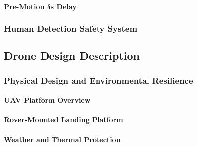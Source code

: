 \paragraph{Pre-Motion 5s Delay}
\label{par:pre_motion_5s_delay}


\subsubsection{Human Detection Safety System}
\label{subsubsec:human_detection_safety_system}


\subsection{Drone Design Description}
\label{subsec:drone_design_description}

\subsubsection{Physical Design and Environmental Resilience}
\label{subsubsec:physical_design_environmental_resilience}

\paragraph{UAV Platform Overview}
\label{par:uav_platform_overview}


\paragraph{Rover-Mounted Landing Platform}
\label{par:rover_mounted_landing_platform}


\paragraph{Weather and Thermal Protection}
\label{par:weather_thermal_protection}


